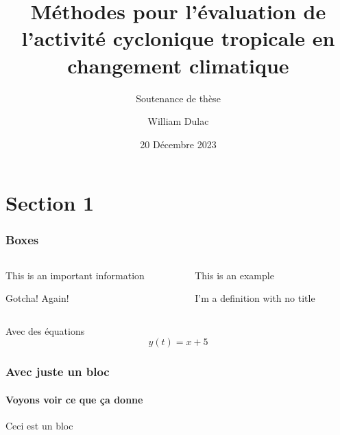 \documentclass[aspectratio=169, usepdftitle=false, xcolor={dvipsnames}, 9pt]{beamer}
\title{Méthodes pour l'évaluation de l'activité cyclonique tropicale en changement climatique}
\author[William]{William Dulac}
\subtitle{Soutenance de thèse}
\institute{Centre National de Recherches Météorologiques}
\date{20 Décembre 2023}
\begin{document}
\maketitle

\section{Section 1}

\begin{frame}
	\frametitle{Boxes}
	\begin{columns}[t]
		\begin{column}{0.45\textwidth}
			\begin{block}
				This is an important information
			\end{block}
			\begin{alertblock}[Argh]
				Gotcha!
				\tcblower
				Again!
			\end{alertblock}
		\end{column}
		\begin{column}{0.45\textwidth}
			\begin{examples}[Example 1]
                This is an example
			\end{examples}
			\begin{definition}
				I'm a definition with no title
			\end{definition}
		\end{column}
	\end{columns}
\end{frame}

\begin{frame}{Avec des équations}
    \begin{equation*}
        y(t) = x + 5
    \end{equation*}
\end{frame}

\begin{frame}[c]
    \frametitle{Avec juste un bloc}
    \framesubtitle{Voyons voir ce que ça donne}
    
    \begin{examples}[Test]
       Ceci est un bloc 
    \end{examples}
\end{frame}
\end{document}
